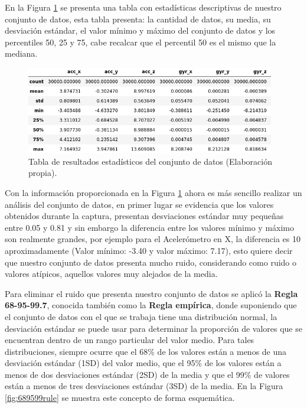 \vspace{5mm} %

En la Figura \ref{tab: est} se presenta una tabla con estad\'{i}sticas descriptivas de nuestro conjunto de datos, esta tabla presenta: la cantidad de datos, su media, su desviaci\'{o}n est\'{a}ndar, el valor m\'{i}nimo y m\'{a}ximo del conjunto de datos y los percentiles 50, 25 y 75, cabe recalcar que el percentil 50 es el mismo que la mediana.

\begin{figure}[h!]
  \begin{center}	\includegraphics[width=0.97\textwidth,frame]{imagenes/Cap3/describe_data}
  \caption{Tabla de resultados estad\'{i}sticos del conjunto de datos (Elaboraci\'{o}n propia).}
  \label{tab: est}
  \end{center}
\end{figure}

\vspace{5mm} %

Con la informaci\'{o}n proporcionada en la Figura \ref{tab: est} ahora es m\'{a}s sencillo realizar un an\'{a}lisis del conjunto de datos, en primer lugar se evidencia que los valores obtenidos durante la captura, presentan desviaciones est\'{a}ndar muy peque\~{n}as entre 0.05 y 0.81 y sin embargo la diferencia entre los valores m\'{i}nimo y m\'{a}ximo son realmente grandes, por ejemplo para el Aceler\'{o}metro en X, la diferencia es 10 aproximadamente (Valor m\'{i}nimo: -3.40 y valor m\'{a}ximo: 7.17), esto quiere decir que nuestro conjunto de datos presenta mucho ruido, considerando como ruido o valores at\'{i}picos, aquellos valores muy alejados de la media. 

\vspace{5mm} %

Para eliminar el ruido que presenta nuestro conjunto de datos se aplic\'{o} la \textbf{Regla 68-95-99.7}, conocida tambi\'{e}n como la \textbf{Regla emp\'{i}rica}, donde suponiendo que el conjunto de datos con el que se trabaja tiene una distribuci\'{o}n normal, la desviaci\'{o}n est\'{a}ndar se puede usar para determinar la proporci\'{o}n de valores que se encuentran dentro de un rango particular del valor medio. Para tales distribuciones, siempre ocurre que el 68\% de los valores est\'{a}n a menos de una desviaci\'{o}n est\'{a}ndar (1SD) del valor medio, que el 95\% de los valores est\'{a}n a menos de dos desviaciones est\'{a}ndar (2SD) de la media y que el 99\% de valores est\'{a}n a menos de tres desviaciones est\'{a}ndar (3SD) de la media. En la Figura \ref{fig:689599rule} se muestra este concepto de forma esquem\'{a}tica.

